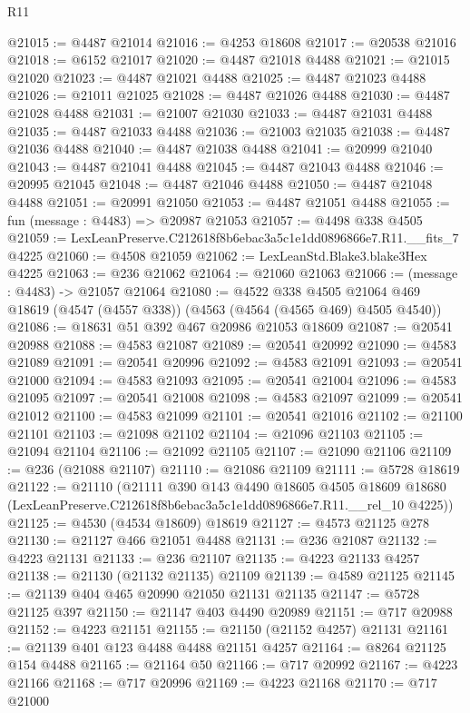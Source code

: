 \begin{lexlean}{R11}
\begin{coremodule}
@21015 := @4487 @21014
@21016 := @4253 @18608
@21017 := @20538 @21016
@21018 := @6152 @21017
@21020 := @4487 @21018 @4488
@21021 := @21015 @21020
@21023 := @4487 @21021 @4488
@21025 := @4487 @21023 @4488
@21026 := @21011 @21025
@21028 := @4487 @21026 @4488
@21030 := @4487 @21028 @4488
@21031 := @21007 @21030
@21033 := @4487 @21031 @4488
@21035 := @4487 @21033 @4488
@21036 := @21003 @21035
@21038 := @4487 @21036 @4488
@21040 := @4487 @21038 @4488
@21041 := @20999 @21040
@21043 := @4487 @21041 @4488
@21045 := @4487 @21043 @4488
@21046 := @20995 @21045
@21048 := @4487 @21046 @4488
@21050 := @4487 @21048 @4488
@21051 := @20991 @21050
@21053 := @4487 @21051 @4488
@21055 := fun (message : @4483) => @20987 @21053
@21057 := @4498 @338 @4505
@21059 := LexLeanPreserve.C212618f8b6ebac3a5c1e1dd0896866e7.R11.__fits_7 @4225
@21060 := @4508 @21059
@21062 := LexLeanStd.Blake3.blake3Hex @4225
@21063 := @236 @21062
@21064 := @21060 @21063
@21066 := (message : @4483) -> @21057 @21064
@21080 := @4522
    @338
    @4505
    @21064
    @469
    @18619
    (@4547 (@4557 @338))
    (@4563 (@4564 (@4565 @469) @4505 @4540))
@21086 := @18631 @51 @392 @467 @20986 @21053 @18609
@21087 := @20541 @20988
@21088 := @4583 @21087
@21089 := @20541 @20992
@21090 := @4583 @21089
@21091 := @20541 @20996
@21092 := @4583 @21091
@21093 := @20541 @21000
@21094 := @4583 @21093
@21095 := @20541 @21004
@21096 := @4583 @21095
@21097 := @20541 @21008
@21098 := @4583 @21097
@21099 := @20541 @21012
@21100 := @4583 @21099
@21101 := @20541 @21016
@21102 := @21100 @21101
@21103 := @21098 @21102
@21104 := @21096 @21103
@21105 := @21094 @21104
@21106 := @21092 @21105
@21107 := @21090 @21106
@21109 := @236 (@21088 @21107)
@21110 := @21086 @21109
@21111 := @5728 @18619
@21122 := @21110
    (@21111
      @390
      @143
      @4490
      @18605
      @4505
      @18609
      @18680
      (LexLeanPreserve.C212618f8b6ebac3a5c1e1dd0896866e7.R11.__rel_10 @4225))
@21125 := @4530 (@4534 @18609) @18619
@21127 := @4573 @21125 @278
@21130 := @21127 @466 @21051 @4488
@21131 := @236 @21087
@21132 := @4223 @21131
@21133 := @236 @21107
@21135 := @4223 @21133 @4257
@21138 := @21130 (@21132 @21135) @21109
@21139 := @4589 @21125
@21145 := @21139 @404 @465 @20990 @21050 @21131 @21135
@21147 := @5728 @21125 @397
@21150 := @21147 @403 @4490 @20989
@21151 := @717 @20988
@21152 := @4223 @21151
@21155 := @21150 (@21152 @4257) @21131
@21161 := @21139 @401 @123 @4488 @4488 @21151 @4257
@21164 := @8264 @21125 @154 @4488
@21165 := @21164 @50
@21166 := @717 @20992
@21167 := @4223 @21166
@21168 := @717 @20996
@21169 := @4223 @21168
@21170 := @717 @21000

\end{coremodule}
\end{lexlean}
